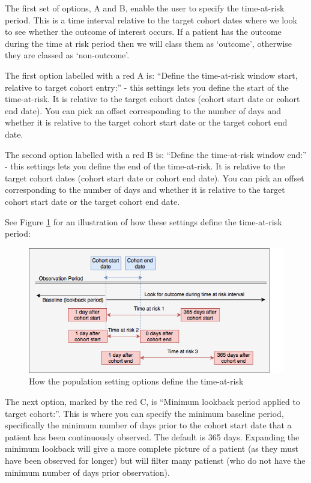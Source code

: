 \documentclass[11pt]{book}
\begin{document}
The first set of options, A and B, enable the user to specify the
time-at-risk period. This is a time interval relative to the target
cohort dates where we look to see whether the outcome of interest
occurs. If a patient has the outcome during the time at risk period then
we will class them as `outcome', otherwise they are classed as
`non-outcome'.

The first option labelled with a red A is: ``Define the time-at-risk
window start, relative to target cohort entry:'' - this settings lets
you define the start of the time-at-risk. It is relative to the target
cohort dates (cohort start date or cohort end date). You can pick an
offset corresponding to the number of days and whether it is relative to
the target cohort start date or the target cohort end date.

The second option labelled with a red B is: ``Define the time-at-risk
window end:'' - this settings lets you define the end of the
time-at-risk. It is relative to the target cohort dates (cohort start
date or cohort end date). You can pick an offset corresponding to the
number of days and whether it is relative to the target cohort start
date or the target cohort end date.

See Figure \ref{fig:figureAS20} for an illustration of how these
settings define the time-at-risk period:

\begin{figure}
\includegraphics[width=1\linewidth]{images/PatientLevelPrediction/atlasImplementation/analysis_population_plot} \caption{How the population setting options define the time-at-risk}\label{fig:figureAS20}
\end{figure}

The next option, marked by the red C, is ``Minimum lookback period
applied to target cohort:''. This is where you can specify the minimum
baseline period, specifically the minimum number of days prior to the
cohort start date that a patient has been continuously observed. The
default is 365 days. Expanding the minimum lookback will give a more
complete picture of a patient (as they must have been observed for
longer) but will filter many patienst (who do not have the minimum
number of days prior observation).
\end{document}
